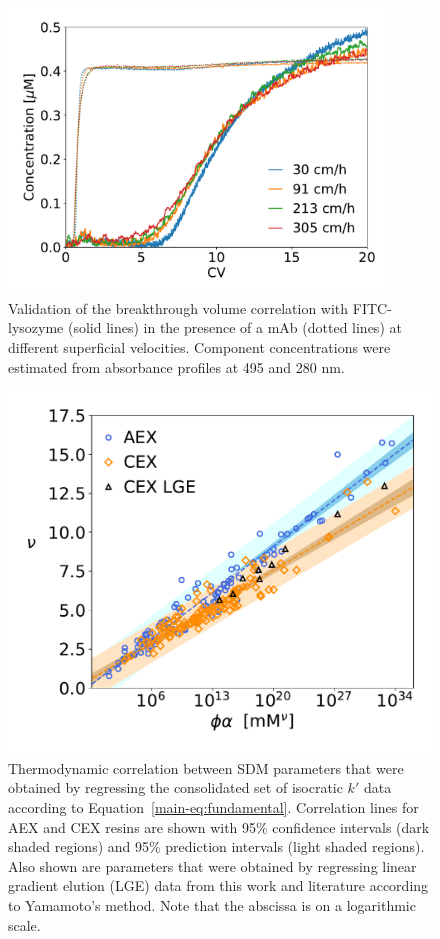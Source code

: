 \documentclass[11pt,a4paper]{article}
\begin{document}
\begin{figure}[bp]
            \centering
            \includegraphics[width=0.9\textwidth]{FITC_lysozyme_concentration}
            \caption{Validation of the breakthrough volume correlation with FITC-lysozyme (solid lines) in the presence of a mAb (dotted lines) at different superficial velocities. Component concentrations were estimated from absorbance profiles at 495 and 280 nm.}
            \label{fig:validation with FITC lysozyme}
\end{figure}


\begin{figure}[htbp]
            \centering
            \includegraphics[width=\textwidth]{sdm_parameter_correlation}
            \caption{
            Thermodynamic correlation between SDM parameters that were obtained by regressing the consolidated set of isocratic $k'$ data according to Equation~\ref{main-eq:fundamental}. Correlation lines for AEX and CEX resins are shown with 95\% confidence intervals (dark shaded regions) and 95\% prediction intervals (light shaded regions). Also shown are parameters that were obtained by regressing linear gradient elution (LGE) data from this work and literature according to Yamamoto's method. Note that the abscissa is on a logarithmic scale.
            }
            \label{fig:sdm parameter correlation}
\end{figure}
\end{document}
